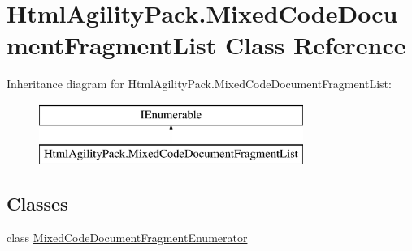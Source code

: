 \hypertarget{class_html_agility_pack_1_1_mixed_code_document_fragment_list}{}\section{Html\+Agility\+Pack.\+Mixed\+Code\+Document\+Fragment\+List Class Reference}
\label{class_html_agility_pack_1_1_mixed_code_document_fragment_list}
Inheritance diagram for Html\+Agility\+Pack.\+Mixed\+Code\+Document\+Fragment\+List\+:\begin{figure}[H]
\begin{center}
\leavevmode
\includegraphics[height=2.000000cm]{class_html_agility_pack_1_1_mixed_code_document_fragment_list}
\end{center}
\end{figure}
\subsection*{Classes}
\begin{DoxyCompactItemize}
\item 
class \hyperlink{class_html_agility_pack_1_1_mixed_code_document_fragment_list_1_1_mixed_code_document_fragment_enumerator}{Mixed\+Code\+Document\+Fragment\+Enumerator}
\end{DoxyCompactItemize}
